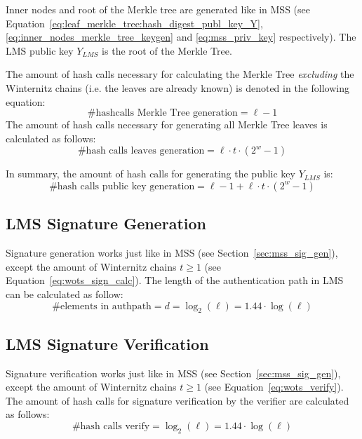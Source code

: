 Inner nodes and root of the Merkle tree are generated like in MSS (see Equation~\ref{eq:leaf_merkle_tree:hash_digest_publ_key_Y}, \ref{eq:inner_nodes_merkle_tree_keygen} and \ref{eq:mss_priv_key} respectively). The LMS public key $Y_{LMS}$ is the root of the Merkle Tree.

The amount of hash calls necessary for calculating the Merkle Tree \textit{excluding} the Winternitz chains (i.e. the leaves are already known) is denoted in the following equation:
\begin{equation}
\text{\# hashcalls Merkle Tree generation} = \ell - 1
\end{equation}
The amount of hash calls necessary for generating all Merkle Tree leaves is calculated as follows:
\begin{equation}
\text{\# hash calls leaves generation} = \ell \cdot t \cdot (2^w-1)
\end{equation}

In summary, the amount of hash calls for generating the public key $Y_{LMS}$ is:
\begin{equation}
\text{\# hash calls public key generation} = \ell - 1 + \ell \cdot t \cdot (2^w-1)
\end{equation}

\subsection{LMS Signature Generation}
Signature generation works just like in MSS (see Section~\ref{sec:mss_sig_gen}), except the amount of Winternitz chains $t \geq 1$ (see Equation~\ref{eq:wots_sign_calc}).
The length of the authentication path in LMS can be calculated as follow:
\begin{equation}
\text{\# elements in authpath} = d = \log_2(\ell) = 1.44 \cdot \log(\ell)
\end{equation}

\subsection{LMS Signature Verification}
Signature verification works just like in MSS (see Section~\ref{sec:mss_sig_gen}), except the amount of Winternitz chains $t \geq 1$ (see Equation~\ref{eq:wots_verify}).
The amount of hash calls for signature verification by the verifier are calculated as follows:
\begin{equation}
\text{\# hash calls verify} = \log_2(\ell) = 1.44 \cdot \log(\ell)  
\end{equation}

